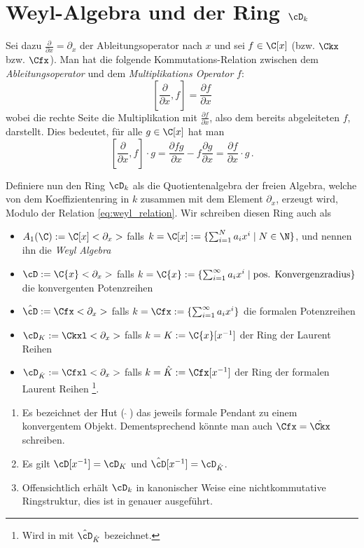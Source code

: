 \section{Weyl-Algebra und der Ring $\cD_k$}
Sei dazu $\frac{\partial}{\partial x}=\partial_x$ der Ableitungsoperator nach
$x$ und sei $f \in \C[x]$ (bzw. $\Ckx$ bzw. $\Cfx$).
Man hat die folgende
Kommutations-Relation zwischen dem \emph{Ableitungsoperator} und dem
\emph{Multiplikations Operator} $f$:
\begin{equation}\label{eq:weyl_relation}
[\frac{\partial}{\partial x},f]=\frac{\partial f}{\partial x}
\end{equation}
wobei die rechte Seite die Multiplikation mit $\frac{\partial f}{\partial x}$,
also dem bereits abgeleiteten $f$, darstellt. Dies bedeutet, für alle
$g\in\C[x]$ hat man
\[
[\frac{\partial}{\partial x},f]\cdot g
=\frac{\partial fg}{\partial x} - f\frac{\partial g}{\partial x}
=\frac{\partial f}{\partial x} \cdot g \,.
\]
\begin{defn}
Definiere nun den Ring $\cD_k$ als die Quotientenalgebra der freien Algebra,
welche von dem Koeffizientenring in $k$ zusammen mit dem Element $\partial_x$,
erzeugt wird, Modulo der Relation \eqref{eq:weyl_relation}.  Wir schreiben
diesen Ring auch als
\begin{itemize}
\item $A_1(\C):=\C[x]<\partial_x>$ falls $k=\C[x]:=\{ \sum^{N}_{i=1}a_ix^i \mid
  N\in \N \}$, und nennen ihn die \emph{Weyl Algebra}
\item $\cD:=\C\{x\}<\partial_x>$ falls $k=\C\{x\}:=\{ \sum^{\infty}_{i=1}a_ix^i
  \mid \mbox{pos.  Konvergenzradius}\}$ die konvergenten Potenzreihen
\item $\hat\cD:=\Cfx<\partial_x>$ falls $k=\Cfx:=\{\sum^{\infty}_{i=1}a_ix^i\}$
  die formalen Potenzreihen
\item $\cD_K:=\Ckxl<\partial_x>$ falls
$k=K:=\C\{x\}[x^{-1}]$ der Ring der Laurent Reihen
\item $\cD_{\hat K}:=\Cfxl<\partial_x>$ falls $k=\hat
K:=\Cfx[x^{-1}]$ der Ring der formalen Laurent Reihen
\footnote{Wird in \cite{ZulaBarbara} mit $\hat\cD_{\hat K}$ bezeichnet.}.
\end{itemize}
\end{defn}
\begin{bem}
\begin{enumerate}
\item Es bezeichnet der Hut ($ \, \hat \,\, $) das jeweils formale Pendant
zu einem konvergentem Objekt. Dementsprechend könnte man auch $\Cfx=\hat{\Ckx}$
schreiben.
\item Es gilt $\cD[x^{-1}]=\cD_K$ und $\hat \cD[x^{-1}]=\cD_{\hat K}$.
\item Offensichtlich erhält $\cD_k$ in kanonischer Weise eine nichtkommutative
Ringstruktur, dies ist in \cite[Kapittel 2 Section 1]{ZulaBarbara} genauer
ausgeführt.
\end{enumerate}
\end{bem}

